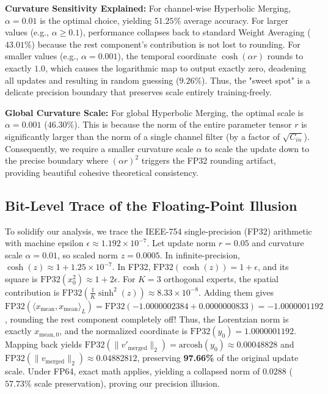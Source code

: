 \documentclass{article}
\theoremstyle{plain}
\theoremstyle{definition}
\theoremstyle{remark}
\begin{document}
\textbf{Curvature Sensitivity Explained:} For channel-wise Hyperbolic Merging, $\alpha=0.01$ is the optimal choice, yielding $51.25\%$ average accuracy. For larger values (e.g., $\alpha \geq 0.1$), performance collapses back to standard Weight Averaging ($43.01\%$) because the rest component's contribution is not lost to rounding. For smaller values (e.g., $\alpha=0.001$), the temporal coordinate $\cosh(\alpha r)$ rounds to exactly $1.0$, which causes the logarithmic map to output exactly zero, deadening all updates and resulting in random guessing ($9.26\%$). Thus, the "sweet spot" is a delicate precision boundary that preserves scale entirely training-freely.

\textbf{Global Curvature Scale:} For global Hyperbolic Merging, the optimal scale is $\alpha=0.001$ ($46.30\%$). This is because the norm of the entire parameter tensor $r$ is significantly larger than the norm of a single channel filter (by a factor of $\sqrt{C_{in}}$). Consequently, we require a smaller curvature scale $\alpha$ to scale the update down to the precise boundary where $(\alpha r)^2$ triggers the FP32 rounding artifact, providing beautiful cohesive theoretical consistency.

\subsection{Bit-Level Trace of the Floating-Point Illusion}
To solidify our analysis, we trace the IEEE-754 single-precision (FP32) arithmetic with machine epsilon $\epsilon \approx 1.192 \times 10^{-7}$. Let update norm $r = 0.05$ and curvature scale $\alpha = 0.01$, so scaled norm $z = 0.0005$. In infinite-precision, $\cosh(z) \approx 1 + 1.25 \times 10^{-7}$. In FP32, $\text{FP32}(\cosh(z)) = 1 + \epsilon$, and its square is $\text{FP32}(x_0^2) \approx 1 + 2\epsilon$. For $K=3$ orthogonal experts, the spatial contribution is $\text{FP32}(\frac{1}{K}\sinh^2(z)) \approx 8.33 \times 10^{-8}$. Adding them gives $\text{FP32}(\langle x_{\text{mean}}, x_{\text{mean}} \rangle_L) = \text{FP32}(-1.0000002384 + 0.0000000833) = -1.0000001192$, rounding the rest component completely off! Thus, the Lorentzian norm is exactly $x_{\text{mean}, 0}$, and the normalized coordinate is $\text{FP32}(y_0) = 1.0000001192$. Mapping back yields $\text{FP32}(\|v'_{\text{merged}}\|_2) = \text{arcosh}(y_0) \approx 0.00048828$ and $\text{FP32}(\|v_{\text{merged}}\|_2) \approx 0.04882812$, preserving \textbf{97.66\%} of the original update scale. Under FP64, exact math applies, yielding a collapsed norm of $0.0288$ ($57.73\%$ scale preservation), proving our precision illusion.
\end{document}
